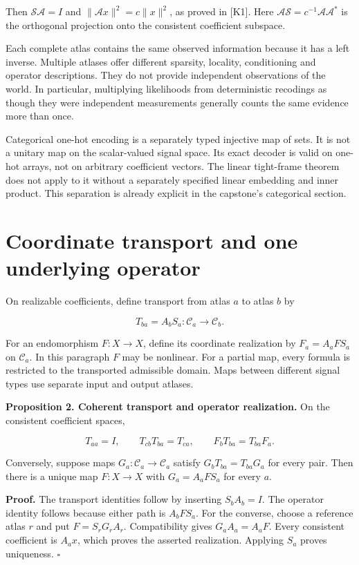 Then \(\mathcal S\mathcal A=I\) and \(\|\mathcal Ax\|^2=c\|x\|^2\), as
proved in {[}K1{]}. Here
\(\mathcal A\mathcal S=c^{-1}\mathcal A\mathcal A^*\) is the orthogonal
projection onto the consistent coefficient subspace.

Each complete atlas contains the same observed information because it
has a left inverse. Multiple atlases offer different sparsity, locality,
conditioning and operator descriptions. They do not provide independent
observations of the world. In particular, multiplying likelihoods from
deterministic recodings as though they were independent measurements
generally counts the same evidence more than once.

Categorical one-hot encoding is a separately typed injective map of
sets. It is not a unitary map on the scalar-valued signal space. Its
exact decoder is valid on one-hot arrays, not on arbitrary coefficient
vectors. The linear tight-frame theorem does not apply to it without a
separately specified linear embedding and inner product. This separation
is already explicit in the capstone's categorical section.

\section{Coordinate transport and one underlying operator}\label{LSM:coordinate-transport-and-one-underlying-operator}

On realizable coefficients, define transport from atlas \(a\) to atlas
\(b\) by

\[
T_{ba}=A_bS_a:\mathcal C_a\longrightarrow\mathcal C_b.
\]

For an endomorphism \(F:X\to X\), define its coordinate realization by
\(F_a=A_aFS_a\) on \(\mathcal C_a\). In this paragraph \(F\) may be
nonlinear. For a partial map, every formula is restricted to the
transported admissible domain. Maps between different signal types use
separate input and output atlases.

\textbf{Proposition 2. Coherent transport and operator realization.} On
the consistent coefficient spaces,

\[
T_{aa}=I,\qquad T_{cb}T_{ba}=T_{ca},\qquad
F_bT_{ba}=T_{ba}F_a.
\]

Conversely, suppose maps \(G_a:\mathcal C_a\to\mathcal C_a\) satisfy
\(G_bT_{ba}=T_{ba}G_a\) for every pair. Then there is a unique map
\(F:X\to X\) with \(G_a=A_aFS_a\) for every \(a\).

\textbf{Proof.} The transport identities follow by inserting
\(S_bA_b=I\). The operator identity follows because either path is
\(A_bFS_a\). For the converse, choose a reference atlas \(r\) and put
\(F=S_rG_rA_r\). Compatibility gives \(G_aA_a=A_aF\). Every consistent
coefficient is \(A_ax\), which proves the asserted realization. Applying
\(S_a\) proves uniqueness. \(\square\)

